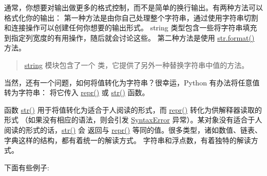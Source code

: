 \documentclass[a4paper,10pt,english]{sphinxmanual}
\begin{document}
通常，你想要对输出做更多的格式控制，而不是简单的换行输出。有两种方法可以格式化你的输出：
第一种方法是由你自己处理整个字符串，通过使用字符串切割和连接操作可以创建任何你想要的输出形式。
string 类型包含一些将字符串填充到指定列宽度的有用操作，随后就会讨论这些。
第二种方法是使用 \href{https://docs.python.org/3/library/stdtypes.html\#str.format}{str.format()} 方法。
\begin{quote}

\href{https://docs.python.org/3/library/string.html\#module-string}{string} 模块包含了一个  类，它提供了另外一种替换字符串中值的方法。
\end{quote}

当然，还有一个问题，如何将值转化为字符串？很幸运，Python 有办法将任意值转为字符串：
将它传入 \href{https://docs.python.org/3/library/functions.html\#repr}{repr()} 或 \href{https://docs.python.org/3/library/stdtypes.html\#str}{str()} 函数。

函数 \href{https://docs.python.org/3/library/stdtypes.html\#str}{str()} 用于将值转化为适合于人阅读的形式，而 \href{https://docs.python.org/3/library/functions.html\#repr}{repr()} 转化为供解释器读取的形式
（如果没有相应的语法，则会引发 \href{https://docs.python.org/3/library/exceptions.html\#SyntaxError}{SyntaxError} 异常）。某对象没有适合于人阅读的形式的话，\href{https://docs.python.org/3/library/stdtypes.html\#str}{str()} 会
返回与 \href{https://docs.python.org/3/library/functions.html\#repr}{repr()} 等同的值。很多类型，诸如数值、链表、字典这样的结构，都有着统一的解读方式。
字符串和浮点数，有着独特的解读方式。

下面有些例子:
\end{document}
